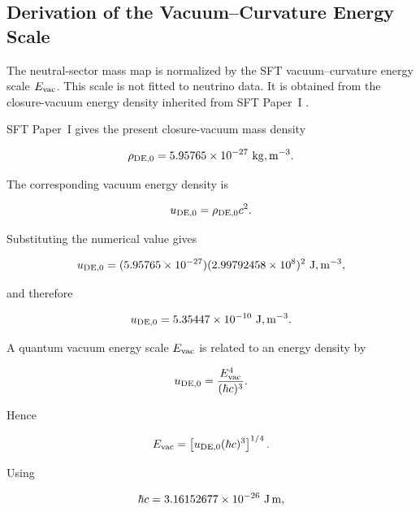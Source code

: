 \documentclass[11pt]{article}
\theoremstyle{definition}
\theoremstyle{remark}
\begin{document}

\subsection{Derivation of the Vacuum--Curvature Energy Scale}
\label{subsec:derivation_Evac}

The neutral-sector mass map is normalized by the SFT
vacuum--curvature energy scale \(E_{\rm vac}\). This scale is
not fitted to neutrino data. It is obtained from the
closure-vacuum energy density inherited from SFT Paper~I
\cite{Egbon2025I}.

SFT Paper~I gives the present closure-vacuum mass density

\begin{equation}
\rho_{{\rm DE},0} =
5.95765\times10^{-27}\ {\rm kg,m^{-3}}.
\end{equation}

The corresponding vacuum energy density is

\begin{equation}
u_{{\rm DE},0} =
\rho_{{\rm DE},0}c^2.
\end{equation}

Substituting the numerical value gives

\begin{equation}
u_{{\rm DE},0} = 
(5.95765\times10^{-27})
(2.99792458\times10^8)^2
\ {\rm J,m^{-3}},
\end{equation}

and therefore

\begin{equation}
u_{{\rm DE},0} = 
5.35447\times10^{-10}\ {\rm J,m^{-3}}.
\label{eq:ude0}
\end{equation}

A quantum vacuum energy scale \(E_{\rm vac}\) is related to an
energy density by

\begin{equation}
u_{{\rm DE},0} =
\frac{E_{\rm vac}^{4}}{(\hbar c)^3}.
\label{eq:vacuum_density_scale}
\end{equation}

Hence

\begin{equation}
E_{\rm vac}
=
\left[
u_{{\rm DE},0}
(\hbar c)^3
\right]^{1/4}.
\label{eq:Evac_from_density}
\end{equation}

Using

\begin{equation}
\hbar c
=
3.16152677\times10^{-26}\ {\rm J\,m},
\end{equation}
\end{document}
